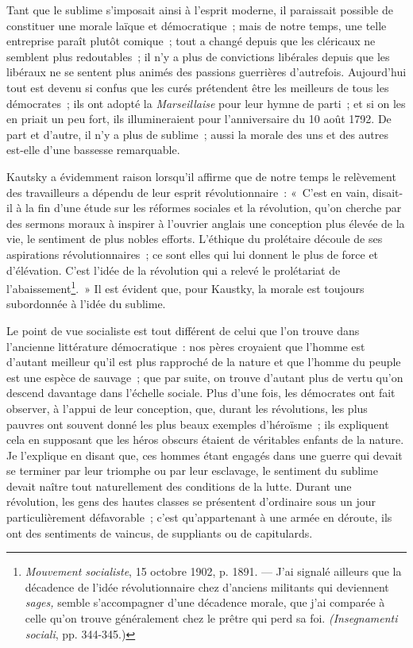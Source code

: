 \documentclass[french,twoside]{book} %
\begin{document}
\noindent Tant que le sublime s’imposait ainsi à l’esprit moderne, il paraissait possible de constituer une morale laïque et démocratique ; mais de notre temps, une telle entreprise paraît plutôt comique ; tout a changé depuis que les cléricaux ne semblent plus redoutables ; il n’y a plus de convictions libérales depuis que les libéraux ne se sentent plus animés des passions guerrières d’autrefois. Aujourd’hui  tout est devenu si confus que les curés prétendent être les meilleurs de tous les démocrates ; ils ont adopté la \emph{Marseillaise} pour leur hymne de parti ; et si on les en priait un peu fort, ils illumineraient pour l’anniversaire du 10 août 1792. De part et d’autre, il n’y a plus de sublime ; aussi la morale des uns et des autres est-elle d’une bassesse remarquable.\par
Kautsky a évidemment raison lorsqu’il affirme que de notre temps le relèvement des travailleurs a dépendu de leur esprit révolutionnaire : « C’est en vain, disait-il à la fin d’une étude sur les réformes sociales et la révolution, qu’on cherche par des sermons moraux à inspirer à l’ouvrier anglais une conception plus élevée de la vie, le sentiment de plus nobles efforts. L’éthique du prolétaire découle de ses aspirations révolutionnaires ; ce sont elles qui lui donnent le plus de force et d’élévation. C’est l’idée de la révolution qui a relevé le prolétariat de l’abaissement\footnote{ \noindent \emph{Mouvement socialiste}, 15 octobre 1902, p. 1891. — J’ai signalé ailleurs que la décadence de l’idée révolutionnaire chez d’anciens militants qui deviennent \emph{sages,} semble s’accompagner d’une décadence morale, que j’ai comparée à celle qu’on trouve généralement chez le prêtre qui perd sa foi. \emph{(Insegnamenti sociali}, pp. 344-345.)
 }. » Il est évident que, pour Kaustky, la morale est toujours subordonnée à l’idée du sublime.\par
Le point de vue socialiste est tout différent de celui que l’on trouve dans l’ancienne littérature démocratique : nos pères croyaient que l’homme est d’autant meilleur qu’il est plus rapproché de la nature et que l’homme du peuple est une espèce de sauvage ; que par  suite, on trouve d’autant plus de vertu qu’on descend davantage dans l’échelle sociale. Plus d’une fois, les démocrates ont fait observer, à l’appui de leur conception, que, durant les révolutions, les plus pauvres ont souvent donné les plus beaux exemples d’héroïsme ; ils expliquent cela en supposant que les héros obscurs étaient de véritables enfants de la nature. Je l’explique en disant que, ces hommes étant engagés dans une guerre qui devait se terminer par leur triomphe ou par leur esclavage, le sentiment du sublime devait naître tout naturellement des conditions de la lutte. Durant une révolution, les gens des hautes classes se présentent d’ordinaire sous un jour particulièrement défavorable ; c’est qu’appartenant à une armée en déroute, ils ont des sentiments de vaincus, de suppliants ou de capitulards.\par
\end{document}
